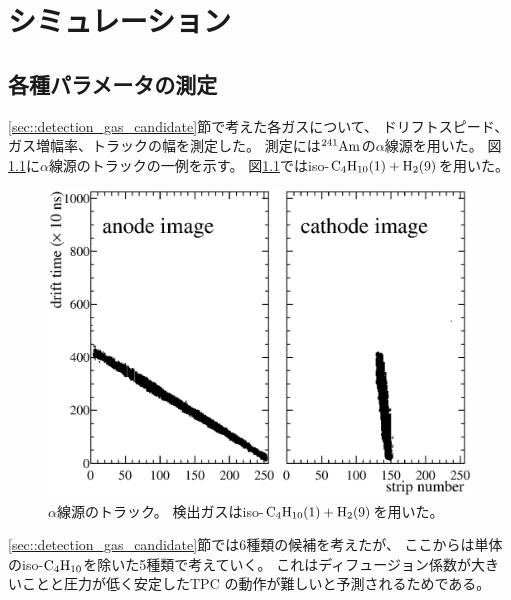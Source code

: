 \chapter{シミュレーション}
\label{chap::simulation}
\section{各種パラメータの測定}
\ref{sec::detection_gas_candidate}節で考えた各ガスについて、
ドリフトスピード、ガス増幅率、トラックの幅を測定した。
測定には${}^{241}{\rm Am}$の$\alpha$線源を用いた。
図\ref{fig::a_source_track}に$\alpha$線源のトラックの一例を示す。
図\ref{fig::a_source_track}ではiso-$\rm C_{4}H_{10} (1) + H_{2} (9)$を用いた。
\begin{figure}
  \centering
  \includegraphics[clip, width=0.9\columnwidth]{eps/0210_7.eps}
  \caption[$\alpha$線源のトラック。]
          {$\alpha$線源のトラック。
          検出ガスはiso-$\rm C_{4}H_{10} (1) + H_{2} (9)$を用いた。}
  \label{fig::a_source_track}
\end{figure}
\ref{sec::detection_gas_candidate}節では6種類の候補を考えたが、
ここからは単体のiso-$\rm C_{4}H_{10}$を除いた5種類で考えていく。
これはディフュージョン係数が大きいことと圧力が低く安定したTPC の動作が難しいと予測されるためである。

